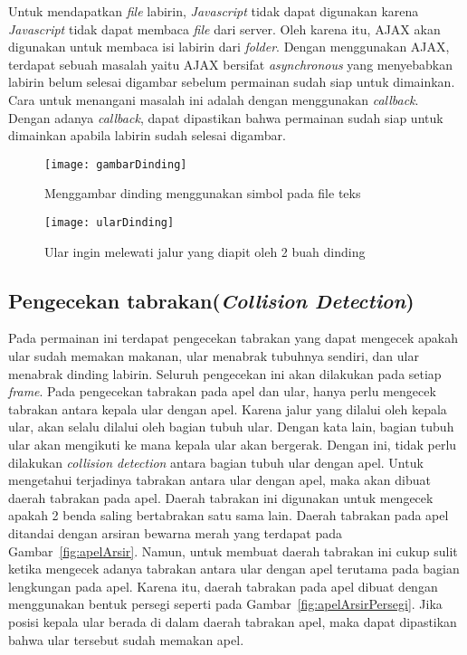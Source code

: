 Untuk mendapatkan \textit{file} labirin, \textit{Javascript} tidak dapat digunakan karena \textit{Javascript} tidak dapat membaca \textit{file} dari server. Oleh karena itu, AJAX akan digunakan untuk membaca isi labirin dari \textit{folder}. Dengan menggunakan AJAX, terdapat sebuah masalah yaitu AJAX bersifat \textit{asynchronous} yang menyebabkan labirin belum selesai digambar sebelum permainan sudah siap untuk dimainkan. Cara untuk menangani masalah ini adalah dengan menggunakan \textit{callback}. Dengan adanya \textit{callback}, dapat dipastikan bahwa permainan sudah siap untuk dimainkan apabila labirin sudah selesai digambar.\\ 

\begin{figure}[H]
	\centering  
	\texttt{[image: gambarDinding]}  
	\caption[Menggambar dinding menggunakan simbol pada file teks]{Menggambar dinding menggunakan simbol pada file teks}
	\label{fig:gambarDinding} 
\end{figure}

\begin{figure}[H]
	\centering  
	\texttt{[image: ularDinding]}  
	\caption[Ular ingin melewati jalur yang diapit oleh 2 buah dinding]{Ular ingin melewati jalur yang diapit oleh 2 buah dinding}
	\label{fig:ularDinding} 
\end{figure}

\subsection{Pengecekan tabrakan(\textit{Collision Detection})}
Pada permainan ini terdapat pengecekan tabrakan yang dapat mengecek apakah ular sudah memakan makanan, ular menabrak tubuhnya sendiri, dan ular menabrak dinding labirin. Seluruh pengecekan ini akan dilakukan pada setiap \textit{frame}. Pada pengecekan tabrakan pada apel dan ular, hanya perlu mengecek tabrakan antara kepala ular dengan apel. Karena jalur yang dilalui oleh kepala ular, akan selalu dilalui oleh bagian tubuh ular. Dengan kata lain, bagian tubuh ular akan mengikuti ke mana kepala ular akan bergerak. Dengan ini, tidak perlu dilakukan \textit{collision detection} antara bagian tubuh ular dengan apel. Untuk mengetahui terjadinya tabrakan antara ular dengan apel, maka akan dibuat daerah tabrakan pada apel. Daerah tabrakan ini digunakan untuk mengecek apakah 2 benda saling bertabrakan satu sama lain. Daerah tabrakan pada apel ditandai dengan arsiran bewarna merah yang terdapat pada Gambar~\ref{fig:apelArsir}. Namun, untuk membuat daerah tabrakan ini cukup sulit ketika mengecek adanya tabrakan antara ular dengan apel terutama pada bagian lengkungan pada apel. Karena itu, daerah tabrakan pada apel dibuat dengan menggunakan bentuk persegi seperti pada Gambar~\ref{fig:apelArsirPersegi}. Jika posisi kepala ular berada di dalam daerah tabrakan apel, maka dapat dipastikan bahwa ular tersebut sudah memakan apel.\\

